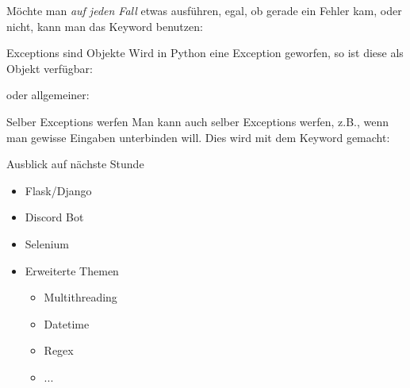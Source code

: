 \begin{frame}{}
	Möchte man \textit{auf jeden Fall} etwas ausführen, egal, ob gerade ein Fehler kam, oder nicht, kann man das Keyword  benutzen:
	
\end{frame}

\begin{frame}{Exceptions sind Objekte}
	Wird in Python eine Exception geworfen, so ist diese als Objekt verfügbar:
	
	oder allgemeiner:
	
\end{frame}

\begin{frame}{Selber Exceptions werfen}
	Man kann auch selber Exceptions werfen, z.B., wenn man gewisse Eingaben unterbinden will. Dies wird mit dem Keyword  gemacht:
	
\end{frame}

\begin{frame}{Ausblick auf nächste Stunde}
	\begin{itemize}
		\item Flask/Django
		\item Discord Bot
		\item Selenium
		\item Erweiterte Themen
		\begin{itemize}
			\item Multithreading
			\item Datetime
			\item Regex
			\item ...
		\end{itemize}
	\end{itemize}
\end{frame}



